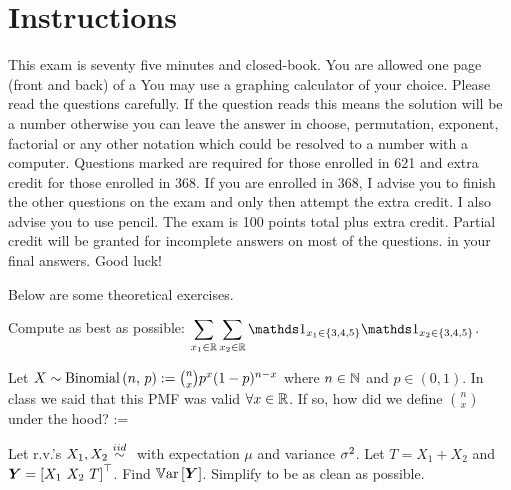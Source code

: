 \documentclass[12pt]{article}
\begin{document}
\section*{Instructions}

This exam is seventy five minutes and closed-book. You are allowed one page (front and back) of a  You may use a graphing calculator of your choice. Please read the questions carefully. If the question reads  this means the solution will be a number otherwise you can leave the answer in choose, permutation, exponent, factorial or any other notation which could be resolved to a number with a computer. Questions marked \qu{[MA]} are required for those enrolled in 621 and extra credit for those enrolled in 368. If you are enrolled in 368, I advise you to finish the other questions on the exam and only then attempt the extra credit. I also advise you to use pencil. The exam is 100 points total plus extra credit. Partial credit will be granted for incomplete answers on most of the questions.  in your final answers. Good luck!

\pagebreak

\problem Below are some theoretical exercises.


\benum

 Compute as best as possible: $\displaystyle\sum_{x_1 \in \reals} \displaystyle\sum_{x_2 \in \reals} \indic{x_1 \in \braces{3,4,5}} \indic{x_2 \in \braces{3,4,5}}$.  






 Let $X \sim \mathrm{Binomial}\left(n,\,p\right) := \binom{n}{x}p^x (1-p)^{n-x}$ where $n \in \mathbb{N}$ and $p \in (0, 1)$. In class we said that this PMF was valid $\forall x \in \mathbb{R}$. If so, how did we define $\binom{n}{x}$ under the hood? 
\vspace{-0.2cm}
\beqn
{} := \quad\quad\quad\quad\quad\quad
\eeqn






 Let r.v.'s $X_1 ,X_2 \iid$ with expectation $\mu$ and variance $\sigma^2$. Let $T = X_1 + X_2$ and $\boldsymbol{Y} = \left[X_1 ~X_2~ T\right]^\top$. Find $\mathbb{V}\text{ar}\left[\boldsymbol{Y}\right]$. Simplify to be as clean as possible. 

\end{document}
